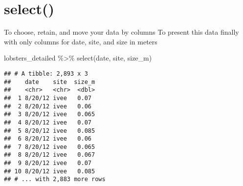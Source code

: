 \documentclass[
]{article}
\newenvironment{Shaded}{\begin{snugshade}}{\end{snugshade}}
\newcommand{\FunctionTok}[1]{\textcolor[rgb]{0.00,0.00,0.00}{#1}}
\newcommand{\NormalTok}[1]{#1}
\newcommand{\SpecialCharTok}[1]{\textcolor[rgb]{0.00,0.00,0.00}{#1}}
\begin{document}
\hypertarget{select}{%
\section{select()}\label{select}}

To choose, retain, and move your data by columns To present this data
finally with only columns for date, site, and size in meters

\begin{Shaded}
\begin{Highlighting}[]
\NormalTok{lobsters\_detailed }\SpecialCharTok{\%\textgreater{}\%}
  \FunctionTok{select}\NormalTok{(date, site, size\_m)}
\end{Highlighting}
\end{Shaded}

\begin{verbatim}
## # A tibble: 2,893 x 3
##    date    site  size_m
##    <chr>   <chr>  <dbl>
##  1 8/20/12 ivee   0.07 
##  2 8/20/12 ivee   0.06 
##  3 8/20/12 ivee   0.065
##  4 8/20/12 ivee   0.07 
##  5 8/20/12 ivee   0.085
##  6 8/20/12 ivee   0.06 
##  7 8/20/12 ivee   0.065
##  8 8/20/12 ivee   0.067
##  9 8/20/12 ivee   0.07 
## 10 8/20/12 ivee   0.085
## # ... with 2,883 more rows
\end{verbatim}
\end{document}
